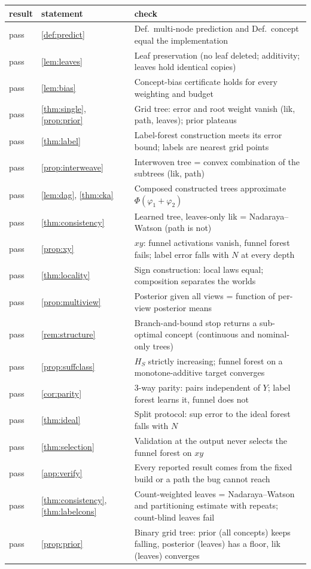 \begin{tabular}{@{}llp{9.2cm}@{}}\toprule
result & statement & check\\\midrule
pass & \cref{def:predict} & Def.~multi-node prediction and Def.~concept equal the implementation\\
pass & \cref{lem:leaves} & Leaf preservation (no leaf deleted; additivity; leaves hold identical copies)\\
pass & \cref{lem:bias} & Concept-bias certificate holds for every weighting and budget\\
pass & \cref{thm:single}, \cref{prop:prior} & Grid tree: error and root weight vanish (lik, path, leaves); prior plateaus\\
pass & \cref{thm:label} & Label-forest construction meets its error bound; labels are nearest grid points\\
pass & \cref{prop:interweave} & Interwoven tree = convex combination of the subtrees (lik, path)\\
pass & \cref{lem:dag}, \cref{thm:cka} & Composed constructed trees approximate $\Phi(\varphi_1+\varphi_2)$\\
pass & \cref{thm:consistency} & Learned tree, leaves-only lik = Nadaraya--Watson (path is not)\\
pass & \cref{prop:xy} & $xy$: funnel activations vanish, funnel forest fails; label error falls with $N$ at every depth\\
pass & \cref{thm:locality} & Sign construction: local laws equal; composition separates the worlds\\
pass & \cref{prop:multiview} & Posterior given all views = function of per-view posterior means\\
pass & \cref{rem:structure} & Branch-and-bound stop returns a sub-optimal concept (continuous and nominal-only trees)\\
pass & \cref{prop:suffclass} & $H_S$ strictly increasing; funnel forest on a monotone-additive target converges\\
pass & \cref{cor:parity} & 3-way parity: pairs independent of $Y$; label forest learns it, funnel does not\\
pass & \cref{thm:ideal} & Split protocol: sup error to the ideal forest falls with $N$\\
pass & \cref{thm:selection} & Validation at the output never selects the funnel forest on $xy$\\
pass & \cref{app:verify} & Every reported result comes from the fixed build or a path the bug cannot reach\\
pass & \cref{thm:consistency}, \cref{thm:labelcons} & Count-weighted leaves = Nadaraya--Watson and partitioning estimate with repeats; count-blind leaves fail\\
pass & \cref{prop:prior} & Binary grid tree: prior (all concepts) keeps falling, posterior (leaves) has a floor, lik (leaves) converges\\
\bottomrule\end{tabular}